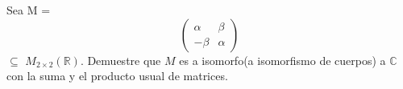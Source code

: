 



Sea M = \begin{equation} \begin{pmatrix} \alpha & \beta \\ -\beta & \alpha \end{pmatrix} \end{equation} $\subseteq$ $M_{2\times 2}(\mathbb{R})$. Demuestre que $M$ es a isomorfo(a isomorfismo de cuerpos) a $\mathbb{C}$ con la suma y el producto usual de matrices.
